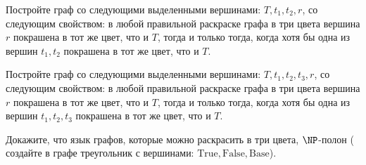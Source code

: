 \begin{enumcyr}
    \item Постройте граф со следующими выделенными вершинами: $T, t_1, t_2, r$, со следующим
        свойством: в любой правильной раскраске графа в три цвета вершина $r$ покрашена в тот же цвет,
        что и $T$, тогда и только тогда, когда хотя бы одна из вершин $t_1, t_2$ покрашена в тот же цвет,
        что и $T$.
    \item Постройте граф со следующими выделенными вершинами: $T, t_1, t_2, t_3, r$, со следующим
        свойством: в любой правильной раскраске графа в три цвета вершина $r$ покрашена в тот же цвет,
        что и $T$, тогда и только тогда, когда хотя бы одна из вершин $t_1, t_2, t_3$ покрашена в тот же
        цвет, что и $T$.
    \item Докажите, что язык графов, которые можно раскрасить в три цвета, $\NP$-полон
        ( создайте в графе треугольник с вершинами: $\mathrm{True}, \mathrm{False},
        \mathrm{Base}$).
\end{enumcyr}